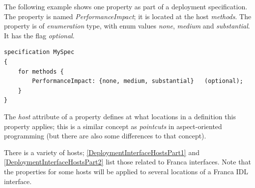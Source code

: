 \documentclass[a4paper,10pt]{scrreprt}
\begin{document}
The following example shows one property as part of a deployment specification.
The property is named \textit{PerformanceImpact}; it is located at the host \textit{methods}.
The property is of \textit{enumeration} type, with enum values \textit{none}, \textit{medium} and
\textit{substantial}. It has the flag \textit{optional}.


\begin{lstlisting}[language=FDeploy]
specification MySpec
{
	for methods {
		PerformanceImpact: {none, medium, substantial}   (optional);
	}
}
\end{lstlisting}

The \textit{host} attribute of a property defines at what locations in a definition
this property applies; this is a similar concept as \textit{pointcuts} in aspect-oriented
programming (but there are also some differences to that concept).

There is a variety of hosts; \autoref{DeploymentInterfaceHostsPart1} and
\autoref{DeploymentInterfaceHostsPart2} list those related to
Franca interfaces. Note that the properties for some hosts will
be applied to several locations of a Franca IDL interface.
\end{document}
